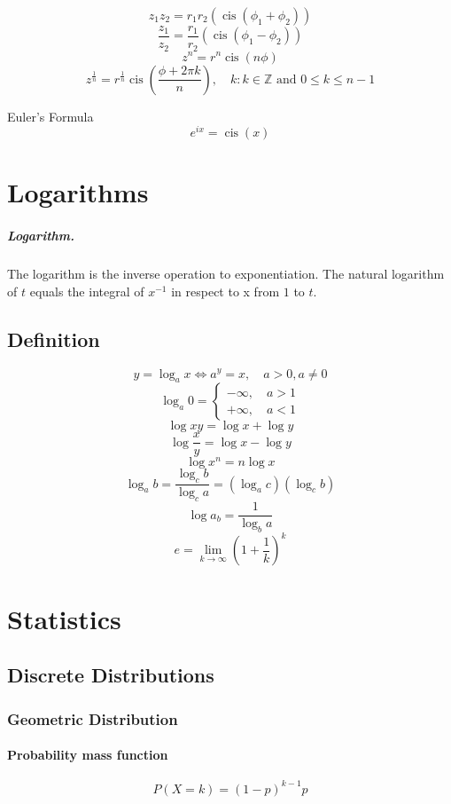 \documentclass[oneside]{book}
\DeclareMathOperator\cis{cis}
\newcommand*\reciprocal[1]{\frac{1}{#1}}
\newcommand*\argument{\phi}
\newcommand*\integers{\mathbb{Z}}
\begin{document}
\[z_1 z_2 = r_1 r_2 \left ( \cis \left ( \phi_1 + \phi_2 \right ) \right )\]
\[\frac{z_1}{z_2} = \frac{r_1}{r_2} \left ( \cis \left ( \phi_1 - \phi_2 \right
) \right )\]
\[z^n = r^n \cis \left ( n \argument \right )\]
\[z^{\reciprocal{n}} = r^{\reciprocal{n}} \cis \left ( \frac{\argument + 2 \pi
k}{n} \right ), \quad
k : k \in \integers \text{ and } 0 \le k \le n - 1\]

Euler's Formula
\[e^{ix} = \cis \left ( x \right)\]

\chapter{Logarithms}

\paragraph{Logarithm.} The logarithm is the inverse operation to exponentiation.
The natural logarithm of \(t\) equals the integral of \(x^{-1}\) in respect to x
from \(1\) to \(t\).

\section{Definition}

\[y = \log_a x \iff a^y = x, \quad a > 0, a \ne 0\]
\[\log_a 0 = \begin{cases} -\infty, \quad a > 1 \\ +\infty, \quad a < 1
\end{cases}\]
\[\log x y = \log x + \log y\]
\[\log \frac{x}{y} = \log x - \log y\]
\[\log x^n = n \log x\]
\[\log_a b = \frac{\log_c b}{\log_c a} = \left ( \log_a c \right ) \left (
\log_c b \right )\]
\[\log a_b = \reciprocal{\log_b a}\]
\[e=\lim_{k\to\infty} \left ( 1 + \reciprocal{k} \right ) ^ k\]

\chapter{Statistics}

\section{Discrete Distributions}
\subsection{Geometric Distribution}
\subsubsection*{Probability mass function}
\[P(X = k) = (1 - p)^{k - 1}p\]
\end{document}
